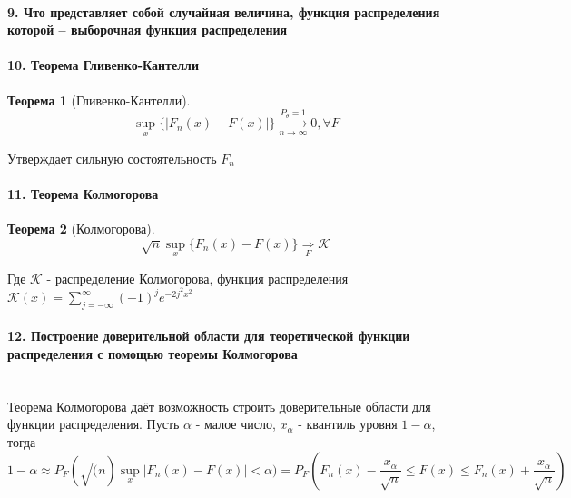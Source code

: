 \documentclass[titlepage]{article}
\newtheorem{theorem}{Теорема}
\begin{document}
\paragraph{9. Что представляет собой случайная величина, функция распределения которой – выборочная функция распределения}

\paragraph{10. Теорема Гливенко-Кантелли}
\begin{theorem}[Гливенко-Кантелли]
	$$\sup_x \{|F_n(x)-F(x)|\} \xrightarrow[n\rightarrow \infty]{P_\theta=1} 0,\forall F$$
\end{theorem}
Утверждает сильную состоятельность $F_n$

\paragraph{11. Теорема Колмогорова}
\begin{theorem}[Колмогорова]
	$$\sqrt{n} \sup_x \{F_n(x)-F(x)\} \underset{F}{\Rightarrow}\mathcal{K}$$
\end{theorem}
Где $\mathcal{K}$ -  распределение Колмогорова, функция распределения ${\mathcal{K}(x) = \sum_{j=-\infty}^{\infty} (-1)^j e^{-2j^2x^2}}$

\paragraph{12. Построение доверительной области для теоретической функции распределения с помощью теоремы Колмогорова} ~\\
Теорема Колмогорова даёт возможность строить доверительные области для функции распределения. Пусть $\alpha$ - малое число, $x_\alpha$ - квантиль уровня $1-\alpha$, тогда
$$1-\alpha \approx P_F(\sqrt(n) \sup_x |F_n(x)-F(x)|<\alpha)={P_F(F_n(x)-\frac{x_\alpha}{\sqrt{n}} \leq F(x) \leq F_n(x)+\frac{x_\alpha}{\sqrt{n}})}$$
\end{document}
